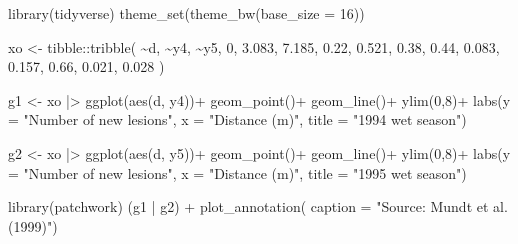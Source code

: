 \documentclass[
  letterpaper,
  DIV=11,
  numbers=noendperiod]{scrreprt}
\newenvironment{Shaded}{\begin{snugshade}}{\end{snugshade}}
\newcommand{\AttributeTok}[1]{\textcolor[rgb]{0.40,0.45,0.13}{#1}}
\newcommand{\DecValTok}[1]{\textcolor[rgb]{0.68,0.00,0.00}{#1}}
\newcommand{\FloatTok}[1]{\textcolor[rgb]{0.68,0.00,0.00}{#1}}
\newcommand{\FunctionTok}[1]{\textcolor[rgb]{0.28,0.35,0.67}{#1}}
\newcommand{\NormalTok}[1]{\textcolor[rgb]{0.00,0.23,0.31}{#1}}
\newcommand{\OtherTok}[1]{\textcolor[rgb]{0.00,0.23,0.31}{#1}}
\newcommand{\SpecialCharTok}[1]{\textcolor[rgb]{0.37,0.37,0.37}{#1}}
\newcommand{\StringTok}[1]{\textcolor[rgb]{0.13,0.47,0.30}{#1}}
\begin{document}
\begin{Shaded}
\begin{Highlighting}[]
\FunctionTok{library}\NormalTok{(tidyverse)}
\FunctionTok{theme\_set}\NormalTok{(}\FunctionTok{theme\_bw}\NormalTok{(}\AttributeTok{base\_size =} \DecValTok{16}\NormalTok{))}

\NormalTok{xo }\OtherTok{\textless{}{-}} 
\NormalTok{tibble}\SpecialCharTok{::}\FunctionTok{tribble}\NormalTok{(}
    \SpecialCharTok{\textasciitilde{}}\NormalTok{d,   }\SpecialCharTok{\textasciitilde{}}\NormalTok{y4,   }\SpecialCharTok{\textasciitilde{}}\NormalTok{y5,}
     \DecValTok{0}\NormalTok{, }\FloatTok{3.083}\NormalTok{, }\FloatTok{7.185}\NormalTok{,}
  \FloatTok{0.22}\NormalTok{, }\FloatTok{0.521}\NormalTok{,  }\FloatTok{0.38}\NormalTok{,}
  \FloatTok{0.44}\NormalTok{, }\FloatTok{0.083}\NormalTok{, }\FloatTok{0.157}\NormalTok{,}
  \FloatTok{0.66}\NormalTok{, }\FloatTok{0.021}\NormalTok{, }\FloatTok{0.028}
\NormalTok{  )}

\NormalTok{g1 }\OtherTok{\textless{}{-}}\NormalTok{ xo }\SpecialCharTok{|\textgreater{}} 
  \FunctionTok{ggplot}\NormalTok{(}\FunctionTok{aes}\NormalTok{(d, y4))}\SpecialCharTok{+}
  \FunctionTok{geom\_point}\NormalTok{()}\SpecialCharTok{+}
  \FunctionTok{geom\_line}\NormalTok{()}\SpecialCharTok{+}
  \FunctionTok{ylim}\NormalTok{(}\DecValTok{0}\NormalTok{,}\DecValTok{8}\NormalTok{)}\SpecialCharTok{+}
  \FunctionTok{labs}\NormalTok{(}\AttributeTok{y =} \StringTok{"Number of new lesions"}\NormalTok{,}
       \AttributeTok{x =} \StringTok{"Distance (m)"}\NormalTok{,}
       \AttributeTok{title =} \StringTok{"1994 wet season"}\NormalTok{)}

\NormalTok{g2 }\OtherTok{\textless{}{-}}\NormalTok{ xo }\SpecialCharTok{|\textgreater{}} 
  \FunctionTok{ggplot}\NormalTok{(}\FunctionTok{aes}\NormalTok{(d, y5))}\SpecialCharTok{+}
  \FunctionTok{geom\_point}\NormalTok{()}\SpecialCharTok{+}
  \FunctionTok{geom\_line}\NormalTok{()}\SpecialCharTok{+}
  \FunctionTok{ylim}\NormalTok{(}\DecValTok{0}\NormalTok{,}\DecValTok{8}\NormalTok{)}\SpecialCharTok{+}
  \FunctionTok{labs}\NormalTok{(}\AttributeTok{y =} \StringTok{"Number of new lesions"}\NormalTok{,}
       \AttributeTok{x =} \StringTok{"Distance (m)"}\NormalTok{,}
       \AttributeTok{title =} \StringTok{"1995 wet season"}\NormalTok{)}

\FunctionTok{library}\NormalTok{(patchwork)}
\NormalTok{(g1 }\SpecialCharTok{|}\NormalTok{ g2) }\SpecialCharTok{+}  \FunctionTok{plot\_annotation}\NormalTok{(}
    \AttributeTok{caption =} \StringTok{"Source: Mundt et al. (1999)"}\NormalTok{)}
\end{Highlighting}
\end{Shaded}
\end{document}
